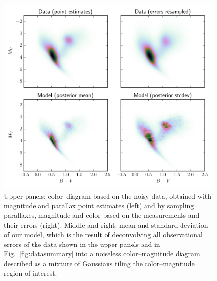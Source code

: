 \documentclass[manuscript, letterpaper]{aastex6}
\newcommand{\figref}[1]{{\xspace}Fig.~\ref{#1}}
\begin{document}
\begin{figure}
\hspace*{-3mm}\includegraphics[width=15cm]{colmagdiag_mainsample.pdf}
\caption{Upper panels: color--diagram based on the noisy data, obtained with magnitude and parallax point estimates (left) and by sampling parallaxes, magnitude and color based on the measurements and their errors (right). Middle and right: mean and standard deviation of our model, which is the result of deconvolving all observational errors of the data shown in the upper panels and in \figref{fig:datasummary} into a noiseless color--magnitude diagram described as a mixture of Gaussians tiling the color--magnitude region of interest. }
\label{fig:colmagdiag_mainsample}
\end{figure}
\end{document}
